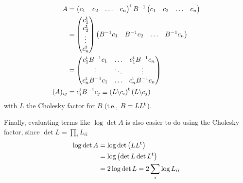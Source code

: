 \documentclass[nobib]{tufte-handout}
\begin{document}
\begin{align}
A &= \begin{pmatrix}
  c_1 & c_2 & \ldots & c_n
\end{pmatrix}^\textrm{t}B^{-1}
\begin{pmatrix}
  c_1 & c_2 & \ldots & c_n
\end{pmatrix}\notag\\
&= \begin{pmatrix}
  c^\textrm{t}_1 \\ c^\textrm{t}_2 \\ \vdots \\c^\textrm{t}_n
\end{pmatrix}\begin{pmatrix}
  B^{-1} c_1 & B^{-1} c_2 & \ldots & B^{-1} c_n
\end{pmatrix}\notag\\
&= \begin{pmatrix}
  c^\textrm{t}_1 B^{-1} c_1 & \ldots & c^\textrm{t}_1B^{-1} c_n \\
  \vdots & \ddots & \vdots \\
  c^\textrm{t}_n B^{-1} c_1 & \ldots & c^\textrm{t}_n B^{-1} c_n
\end{pmatrix}\notag\\
(A)_{ij} &= c^\textrm{t}_i B^{-1} 
c_j\equiv \left(L \backslash c_i\right)^\textrm{t} \left(L \backslash c_j\right)\label{e:cholesky_transform}
\end{align}
with $L$ the Cholesky factor for $B$ (i.e., $B = L L^\textrm{t}$).

Finally, evaluating terms like $\log{\det{A}}$ is also easier to do using the Cholesky factor, since $\det{L} = \prod_i L_{ii}$
\begin{align}
  \log{\det{A}} &= \log{\det{\left(L L^\textrm{t}\right)}} \notag\\
  &= \log{\left(\det{L} \det{L^\textrm{t}}\right)} \notag\\
  &= 2\log{\det{L}} = 2\sum_i \log{L_{ii}}\label{e:cholesky_det}
\end{align}


\end{document}
